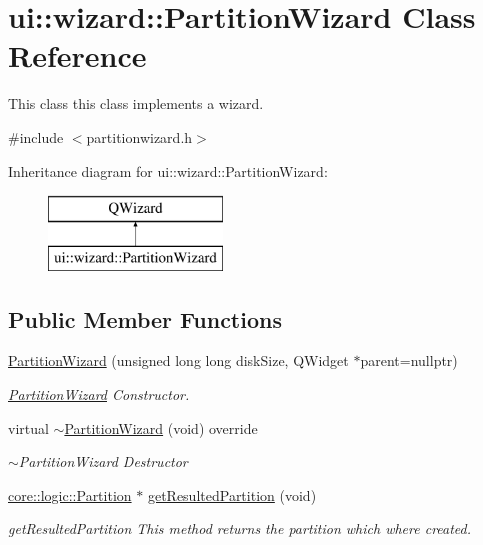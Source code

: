 \hypertarget{classui_1_1wizard_1_1_partition_wizard}{}\section{ui\+:\+:wizard\+:\+:Partition\+Wizard Class Reference}
\label{classui_1_1wizard_1_1_partition_wizard}


This class this class implements a wizard.  




{\ttfamily \#include $<$partitionwizard.\+h$>$}

Inheritance diagram for ui\+:\+:wizard\+:\+:Partition\+Wizard\+:\begin{figure}[H]
\begin{center}
\leavevmode
\includegraphics[height=2.000000cm]{classui_1_1wizard_1_1_partition_wizard}
\end{center}
\end{figure}
\subsection*{Public Member Functions}
\begin{DoxyCompactItemize}
\item 
\mbox{\hyperlink{classui_1_1wizard_1_1_partition_wizard_aab98955e5371a971ac94b7f0d4b24258}{Partition\+Wizard}} (unsigned long long disk\+Size, Q\+Widget $\ast$parent=nullptr)
\begin{DoxyCompactList}\small\item\em \mbox{\hyperlink{classui_1_1wizard_1_1_partition_wizard}{Partition\+Wizard}} Constructor. \end{DoxyCompactList}\item 
virtual \mbox{\hyperlink{classui_1_1wizard_1_1_partition_wizard_a356484066944c627c00346690d3ffc80}{$\sim$\+Partition\+Wizard}} (void) override
\begin{DoxyCompactList}\small\item\em $\sim$\+Partition\+Wizard Destructor \end{DoxyCompactList}\item 
\mbox{\hyperlink{classcore_1_1logic_1_1_partition}{core\+::logic\+::\+Partition}} $\ast$ \mbox{\hyperlink{classui_1_1wizard_1_1_partition_wizard_a0ae0814425acc12ed09291de436f8771}{get\+Resulted\+Partition}} (void)
\begin{DoxyCompactList}\small\item\em get\+Resulted\+Partition This method returns the partition which where created. \end{DoxyCompactList}\end{DoxyCompactItemize}
